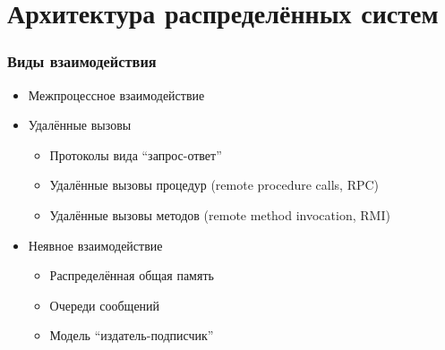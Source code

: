 \documentclass{../../slides-style}
\begin{document}
    \section{Архитектура распределённых систем}

    \begin{frame}
        \frametitle{Виды взаимодействия}
        \begin{itemize}
            \item Межпроцессное взаимодействие
            \item Удалённые вызовы
            \begin{itemize}
                \item Протоколы вида ``запрос-ответ''
                \item Удалённые вызовы процедур (remote procedure calls, RPC)
                \item Удалённые вызовы методов (remote method invocation, RMI)
            \end{itemize}
            \item Неявное взаимодействие
            \begin{itemize}
                \item Распределённая общая память
                \item Очереди сообщений
                \item Модель ``издатель-подписчик''
            \end{itemize}
        \end{itemize}
    \end{frame}
\end{document}

